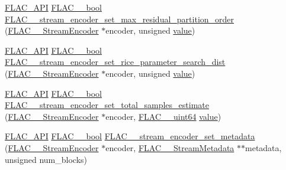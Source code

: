 \begin{DoxyCompactItemize}
\item 
\mbox{\hyperlink{group__flac__export_ga56ca07df8a23310707732b1c0007d6f5}{F\+L\+A\+C\+\_\+\+A\+PI}} \mbox{\hyperlink{ordinals_8h_a95103469f1cbd78b8cf250194985b34e}{F\+L\+A\+C\+\_\+\+\_\+bool}} \mbox{\hyperlink{group__flac__stream__encoder_ga6de153da5a8eeeb1be2271c27fa58b37}{F\+L\+A\+C\+\_\+\+\_\+stream\+\_\+encoder\+\_\+set\+\_\+max\+\_\+residual\+\_\+partition\+\_\+order}} (\mbox{\hyperlink{struct_f_l_a_c_____stream_encoder}{F\+L\+A\+C\+\_\+\+\_\+\+Stream\+Encoder}} $\ast$encoder, unsigned \mbox{\hyperlink{_s_d_l__opengl__glext_8h_a8ad81492d410ff2ac11f754f4042150f}{value}})
\item 
\mbox{\hyperlink{group__flac__export_ga56ca07df8a23310707732b1c0007d6f5}{F\+L\+A\+C\+\_\+\+A\+PI}} \mbox{\hyperlink{ordinals_8h_a95103469f1cbd78b8cf250194985b34e}{F\+L\+A\+C\+\_\+\+\_\+bool}} \mbox{\hyperlink{group__flac__stream__encoder_ga668de93e7061bce21475c062ffab3e18}{F\+L\+A\+C\+\_\+\+\_\+stream\+\_\+encoder\+\_\+set\+\_\+rice\+\_\+parameter\+\_\+search\+\_\+dist}} (\mbox{\hyperlink{struct_f_l_a_c_____stream_encoder}{F\+L\+A\+C\+\_\+\+\_\+\+Stream\+Encoder}} $\ast$encoder, unsigned \mbox{\hyperlink{_s_d_l__opengl__glext_8h_a8ad81492d410ff2ac11f754f4042150f}{value}})
\item 
\mbox{\hyperlink{group__flac__export_ga56ca07df8a23310707732b1c0007d6f5}{F\+L\+A\+C\+\_\+\+A\+PI}} \mbox{\hyperlink{ordinals_8h_a95103469f1cbd78b8cf250194985b34e}{F\+L\+A\+C\+\_\+\+\_\+bool}} \mbox{\hyperlink{group__flac__stream__encoder_ga0d3f45052f2f7379c73e2b027c7f956c}{F\+L\+A\+C\+\_\+\+\_\+stream\+\_\+encoder\+\_\+set\+\_\+total\+\_\+samples\+\_\+estimate}} (\mbox{\hyperlink{struct_f_l_a_c_____stream_encoder}{F\+L\+A\+C\+\_\+\+\_\+\+Stream\+Encoder}} $\ast$encoder, \mbox{\hyperlink{ordinals_8h_aa78c8c70a3eb8a58af7436f278acde8e}{F\+L\+A\+C\+\_\+\+\_\+uint64}} \mbox{\hyperlink{_s_d_l__opengl__glext_8h_a8ad81492d410ff2ac11f754f4042150f}{value}})
\item 
\mbox{\hyperlink{group__flac__export_ga56ca07df8a23310707732b1c0007d6f5}{F\+L\+A\+C\+\_\+\+A\+PI}} \mbox{\hyperlink{ordinals_8h_a95103469f1cbd78b8cf250194985b34e}{F\+L\+A\+C\+\_\+\+\_\+bool}} \mbox{\hyperlink{group__flac__stream__encoder_ga67b30b1a67a9274f7708a22154b225f6}{F\+L\+A\+C\+\_\+\+\_\+stream\+\_\+encoder\+\_\+set\+\_\+metadata}} (\mbox{\hyperlink{struct_f_l_a_c_____stream_encoder}{F\+L\+A\+C\+\_\+\+\_\+\+Stream\+Encoder}} $\ast$encoder, \mbox{\hyperlink{struct_f_l_a_c_____stream_metadata}{F\+L\+A\+C\+\_\+\+\_\+\+Stream\+Metadata}} $\ast$$\ast$metadata, unsigned num\+\_\+blocks)
\item 
$$
\end{DoxyCompactItemize}

